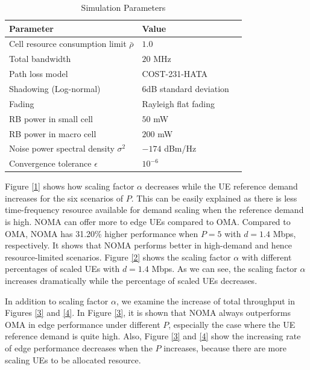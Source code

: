\documentclass[10pt,journal,final,finalsubmission,twocolumn]{IEEEtran}
\begin{document}
\begin{table}[htbp]
 \caption{\label{tab:test}Simulation Parameters}
 \begin{center}
 \begin{tabular}{lll}
  \toprule
  \textbf{Parameter} & \textbf{Value}  \\
  \midrule
 Cell resource consumption limit $\bar{\rho}$ & $1.0$  \\
 Total bandwidth & $20$ MHz  \\
 Path loss model & COST-231-HATA\\
 Shadowing (Log-normal) &$6$dB standard deviation\\
 Fading &Rayleigh flat fading\\
 RB power in small cell & $50$ mW \\
 RB power in macro cell & $200$ mW \\
  Noise power spectral density $\sigma ^2$ & $-174$ dBm/Hz  \\
 Convergence tolerance $\epsilon$ & $10^{-6}$ \\

  \bottomrule
 \end{tabular}
  \end{center}
\end{table}


Figure \ref{1} shows how scaling factor $\alpha$ decreases while the UE reference demand increases for the six scenarios of $P$. This can be easily explained as there is less time-frequency resource available for demand scaling when the reference demand is high. NOMA can offer more to edge UEs compared to OMA. Compared to OMA, NOMA has 31.20\% higher performance when $P=5$ with $d=1.4$ Mbps, respectively. It shows that NOMA performs better in high-demand and hence resource-limited scenarios. Figure \ref{2} shows the scaling factor $\alpha $ with different percentages of scaled UEs with $d = 1.4$ Mbps. As we can see, the scaling factor $\alpha$ increases dramatically while the percentage of scaled UEs decreases. 

In addition to scaling factor $\alpha$, we examine the increase of total throughput in Figures \ref{3} and \ref{4}. In Figure \ref{3}, it is shown that NOMA always outperforms OMA in edge performance under different $P$, especially the case where the UE reference demand is quite high. Also, Figure \ref{3} and \ref{4} show the increasing rate of edge performance decreases when the $P$ increases, because there are more scaling UEs to be allocated resource.
\end{document}
